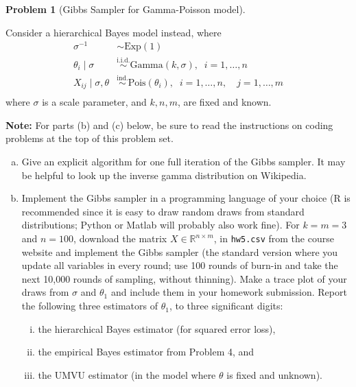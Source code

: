 \documentclass{article}
\newcommand{\RR}{\mathbb{R}}
\newcommand{\simiid}{\overset{\text{i.i.d.}}{\sim}}
\newcommand{\simind}{\overset{\text{ind.}}{\sim}}
\theoremstyle{definition}
\newtheorem{problem}{Problem}
\begin{document}
\begin{problem}[Gibbs Sampler for Gamma-Poisson model]\label{prob:gibbspoisson}

Consider a hierarchical Bayes model instead, where
\begin{align*}
  \sigma^{-1} &\sim \text{Exp}(1)\\
  \theta_i \mid \sigma &\simiid \text{Gamma}(k,\sigma), \;\; i=1,\ldots,n\\
  X_{ij} \mid \sigma, \theta &\simind \text{Pois}(\theta_i), \;\; i=1,\ldots,n, \quad j = 1,\ldots,m\\
\end{align*}
where $\sigma$ is a scale parameter, and $k,n,m$, are fixed and known.

{\bf Note:} For parts (b) and (c) below, be sure to read the instructions on coding problems at the top of this problem set.

\begin{enumerate}[(a)]
\item Give an explicit algorithm for one full iteration of the Gibbs sampler. It may be helpful to look up the inverse gamma distribution on Wikipedia.





\item Implement the Gibbs sampler in a programming language of your choice (R is recommended since it is easy to draw random draws from standard distributions; Python or Matlab will probably also work fine). For $k=m=3$ and $n=100$, download the matrix $X \in \RR^{n \times m}$, in \texttt{hw5.csv} from the course website and implement the Gibbs sampler (the standard version where you update all variables in every round; use 100 rounds of burn-in and take the next 10,000 rounds of sampling, without thinning). Make a trace plot of your draws from $\sigma$ and $\theta_1$ and include them in your homework submission. Report the following three estimators of $\theta_1$, to three significant digits:
\begin{enumerate}[(i)]
\item the hierarchical Bayes estimator (for squared error loss),
\item the empirical Bayes estimator from Problem 4, and
\item the UMVU estimator (in the model where $\theta$ is fixed and unknown).
\end{enumerate}




\end{enumerate}
\end{problem}
\end{document}
